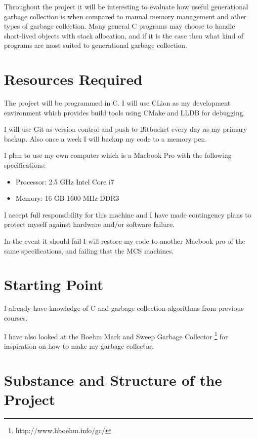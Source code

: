 \documentclass[12pt, a4]{article}
\begin{document}
Throughout the project it will be interesting to evaluate how useful generational garbage collection is when compared to manual memory management and other types of garbage collection. Many general C programs may choose to handle short-lived objects with stack allocation, and if it is the case then what kind of programs are most suited to generational garbage collection.

\section*{Resources Required}

The project will be programmed in C. I will use CLion as my development environment which provides build tools using CMake and LLDB for debugging.

I will use Git as version control and push to Bitbucket every day as my primary backup. Also once a week I will backup my code to a memory pen.

I plan to use my own computer which is a Macbook Pro with the following specifications:

\begin{itemize}

	\item Processor: 2.5 GHz Intel Core i7
	\item Memory: 16 GB 1600 MHz DDR3

\end{itemize}

I accept full responsibility for this machine and I have made contingency plans to protect myself against hardware and/or software failure.

In the event it should fail I will restore my code to another Macbook pro of the same specifications, and failing that the MCS machines.

\section*{Starting Point}
I already have knowledge of C and garbage collection algorithms from previous courses.

I have also looked at the Boehm Mark and Sweep Garbage Collector \footnote{http://www.hboehm.info/gc/} for inspiration on how to make my garbage collector.

\section*{Substance and Structure of the Project}
\end{document}
